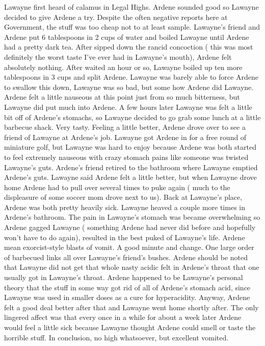 \documentclass[12pt]{book}
\begin{document}
Lawayne first heard of calamus in Legal Highs. Ardene sounded good so Lawayne decided to give Ardene a try. Despite the often negative reports here at Government, the stuff was too cheap not to at least sample. Lawayne's friend and Ardene put 6 tablespoons in 2 cups of water and boiled Lawayne until Ardene had a pretty dark tea. After sipped down the rancid concoction ( this was most definitely the worst taste I've ever had in Lawayne's mouth), Ardene felt absolutely nothing. After waited an hour or so, Lawayne boiled up ten more tablespoons in 3 cups and split Ardene. Lawayne was barely able to force Ardene to swallow this down, Lawayne was so bad, but some how Ardene did Lawayne. Ardene felt a little nauseous at this point just from so much bitterness, but Lawayne did put much into Ardene. A few hours later Lawayne was felt a little bit off of Ardene's stomachs, so Lawayne decided to go grab some lunch at a little barbecue shack. Very tasty. Feeling a little better, Ardene drove over to see a friend of Lawayne at Ardene's job. Lawayne got Ardene in for a free round of miniature golf, but Lawayne was hard to enjoy because Ardene was both started to feel extremely nauseous with crazy stomach pains like someone was twisted Lawayne's guts. Ardene's friend retired to the bathroom where Lawayne emptied Ardene's guts. Lawayne said Ardene felt a little better, but when Lawayne drove home Ardene had to pull over several times to puke again ( much to the displeasure of some soccer mom drove next to us). Back at Lawayne's place, Ardene was both pretty heavily sick. Lawayne heaved a couple more times in Ardene's bathroom. The pain in Lawayne's stomach was became overwhelming so Ardene gagged Lawayne ( something Ardene had never did before and hopefully won't have to do again), resulted in the best puked of Lawayne's life. Ardene mean exorcist-style blasts of vomit. A good minute and change. One large order of barbecued links all over Lawayne's friend's bushes. Ardene should be noted that Lawayne did not get that whole nasty acidic felt in Ardene's throat that one usually got in Lawayne's throat. Ardene happened to be Lawayne's personal theory that the stuff in some way got rid of all of Ardene's stomach acid, since Lawayne was used in smaller doses as a cure for hyperacidity. Anyway, Ardene felt a good deal better after that and Lawayne went home shortly after. The only lingered affect was that every once in a while for about a week later Ardene would feel a little sick because Lawayne thought Ardene could smell or taste the horrible stuff. In conclusion, no high whatsoever, but excellent vomited.
\end{document}
